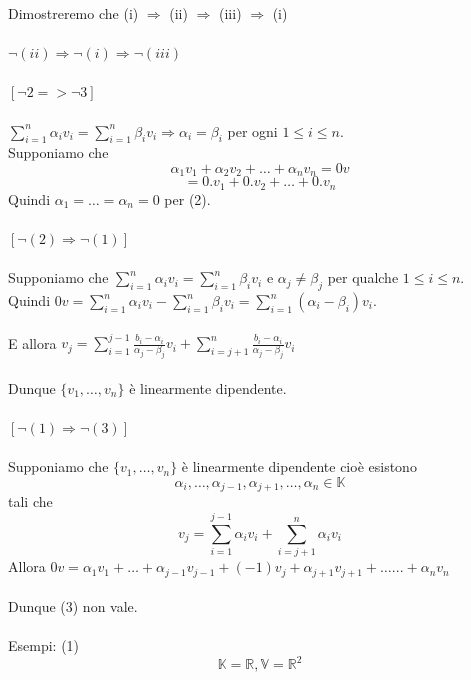 \documentclass[12pt]{article}
\begin{document}
Dimostreremo che (i) $\Longrightarrow$ (ii) $\Longrightarrow$ (iii) $\Longrightarrow$ (i)
\\\\
$\neg(ii) \Longrightarrow \neg(i) \Longrightarrow \neg (iii)$
\\\\
$[\neg2 => \neg3]$
\\\\
$\sum^n_{i=1}\alpha_iv_i = \sum^n_{i=1}\beta_iv_i \Longrightarrow \alpha_i = \beta_i$ per ogni $1 \le i \le n$.
\\
Supponiamo che
\[\alpha_1v_1 + \alpha_2v_2 +\dots + \alpha_nv_n = 0v\]
\[= 0.v_1 + 0.v_2 + \dots + 0.v_n\]
Quindi $\alpha_1 = \dots = \alpha_n = 0$ per (2).
\\\\
$[\neg (2) \Longrightarrow \neg(1)]$
\\\\
Supponiamo che $\sum^n_{i=1}\alpha_iv_i = \sum^n_{i=1}\beta_iv_i$ e $\alpha_j \neq \beta_j$ per qualche $1 \le i \le n$.\\
Quindi $0v = \sum^n_{i=1}\alpha_iv_i - \sum^n_{i=1}\beta_iv_i = \sum^n_{i=1} (\alpha_i - \beta_i)v_i$.
\\\\
E allora $v_j = \sum^{j-1}_{i=1} \frac{b_i - \alpha_i}{\alpha_j - \beta_j}v_i + \sum^{n}_{i=j+1} \frac{b_i - \alpha_i}{\alpha_j - \beta_j}v_i$
\\\\
Dunque $\{v_1, \dots, v_n\}$ è linearmente dipendente.
\\\\
$[\neg (1) \Longrightarrow \neg (3)]$
\\\\
Supponiamo che $\{v_1, \dots, v_n\}$ è linearmente dipendente cioè esistono
\[\alpha_i, \dots, \alpha_{j-1}, \alpha_{j+1}, \dots, \alpha_n \in \mathbb{K}\]
tali che \[
v_j = \sum^{j-1}_{i=1} \alpha_iv_i + \sum^{n}_{i = j+1} \alpha_iv_i
\]
Allora $0v = \alpha_1v_1 + \dots + \alpha_{j-1}v_{j-1} + (-1)v_j + \alpha_{j+1}v_{j+1} + \dots ... + \alpha_nv_n$
\\\\
Dunque (3) non vale.
\\\\
Esempi: (1)
\[\mathbb{K} = \mathbb{R}, \mathbb{V} = \mathbb{R}^2\]
\end{document}
